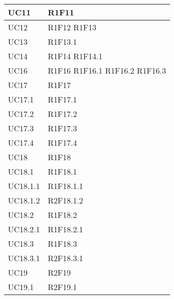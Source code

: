 \begin{center}
\begin{longtable}{|p{44mm}|p{22mm}|}
\\
\hline
UC11 &
R1F11 \newline
\\
\hline
UC12 &
R1F12 \newline
R1F13 \newline
\\
\hline
UC13 &
R1F13.1 \newline
\\
\hline
UC14 &
R1F14 \newline
R1F14.1 \newline
\\
\hline
UC16 &
R1F16 \newline
R1F16.1 \newline
R1F16.2 \newline
R1F16.3 \newline
\\
\hline
UC17 &
R1F17 \newline
\\
\hline
UC17.1 &
R1F17.1 \newline
\\
\hline
UC17.2 &
R1F17.2 \newline
\\
\hline
UC17.3 &
R1F17.3 \newline
\\
\hline
UC17.4 &
R1F17.4 \newline
\\
\hline
UC18 &
R1F18 \newline
\\
\hline
UC18.1 &
R1F18.1 \newline
\\
\hline
UC18.1.1 &
R1F18.1.1 \newline
\\
\hline
UC18.1.2 &
R2F18.1.2 \newline
\\
\hline
UC18.2 &
R1F18.2 \newline
\\
\hline
UC18.2.1 &
R1F18.2.1 \newline
\\
\hline
UC18.3 &
R1F18.3 \newline
\\
\hline
UC18.3.1 &
R2F18.3.1 \newline
\\
\hline
UC19 &
R2F19 \newline
\\
\hline
UC19.1 &
R2F19.1 \newline
\\

\end{longtable}
\end{center}
